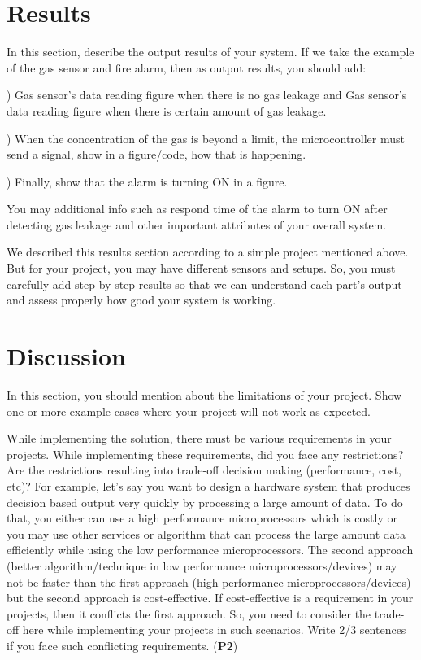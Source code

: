 \documentclass[conference]{IEEEtran}
\begin{document}
\section{Results}

In this section, describe the output results of your system. If we take the example of the gas sensor and fire alarm, then as output results, you should add:

) Gas sensor's data reading figure when there is no gas leakage and Gas sensor's data reading figure when there is certain amount of gas leakage.

) When the concentration of the gas is beyond a limit, the microcontroller must send a signal, show in a figure/code, how that is happening.

) Finally, show that the alarm is turning ON in a figure.

\noindent You may additional info such as respond time of the alarm to turn ON after detecting gas leakage and other important attributes of your overall system.

\noindent We described this results section according to a simple project mentioned above. But for your project, you may have different sensors and setups. So, you must carefully add step by step results so that we can understand each part's output and assess properly how good your system is working.
\section{Discussion}
In this section, you should mention about the limitations of your project. Show one or more example cases where your project will not work as expected.

While implementing the solution, there must be various requirements in your projects. While implementing these requirements, did you face any restrictions? Are the restrictions resulting into trade-off decision making (performance, cost, etc)? For example, let's say you want to design a hardware system that produces decision based output very quickly by processing a large amount of data. To do that, you either can use a high performance microprocessors which is costly or you may use other services or algorithm that can process the large amount data efficiently while using the low performance microprocessors. The second approach (better algorithm/technique in low performance microprocessors/devices) may not be faster than the first approach (high performance microprocessors/devices) but the second approach is cost-effective. If cost-effective is a requirement in your projects, then it conflicts the first approach. So, you need to consider the trade-off here while implementing your projects in such scenarios. Write 2/3 sentences if you face such conflicting requirements.  (\textbf{P2}) 
\end{document}
